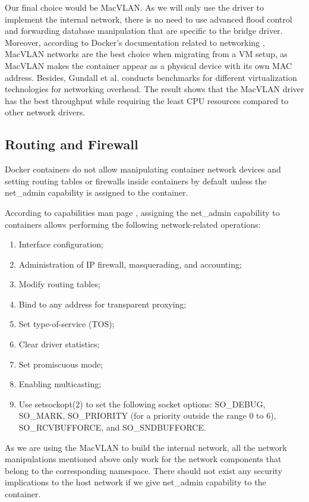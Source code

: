 \documentclass[article]{aaltoseries}
\begin{document}
Our final choice would be MacVLAN. As we will only use the driver to implement the internal network, there is no need to use advanced flood control and forwarding database manipulation that are specific to the bridge driver. Moreover, according to Docker's documentation related to networking \cite{docker_documentation_2023}, MacVLAN networks are the best choice when migrating from a VM setup, as MacVLAN makes the container appear as a physical device with its own MAC address. Besides, Gundall et al. \cite{9442123} conducts benchmarks for different virtualization technologies for networking overhead. The result shows that the MacVLAN driver has the best throughput while requiring the least CPU resources compared to other network drivers.

\subsection{Routing and Firewall}

Docker containers do not allow manipulating container network devices and setting routing tables or firewalls inside containers by default unless the net\_admin capability is assigned to the container.

According to capabilities man page \cite{capabilities}, assigning the net\_admin capability to containers allows performing the following network-related operations:
\begin{enumerate}
\setlength{\itemsep}{0pt}
\setlength{\parsep}{0pt}
\setlength{\parskip}{0pt}
\item Interface configuration;
\item Administration of IP firewall, masquerading, and accounting;
\item Modify routing tables;
\item Bind to any address for transparent proxying;
\item Set type-of-service (TOS);
\item Clear driver statistics;
\item Set promiscuous mode;
\item Enabling multicasting;
\item Use setsockopt(2) to set the following socket options:
SO\_DEBUG, SO\_MARK, SO\_PRIORITY (for a priority outside the
range 0 to 6), SO\_RCVBUFFORCE, and SO\_SNDBUFFORCE.
\end{enumerate}

As we are using the MacVLAN to build the internal network, all the network manipulations mentioned above only work for the network components that belong to the corresponding namespace. There should not exist any security implications to the host network if we give net\_admin capability to the container.
\end{document}
